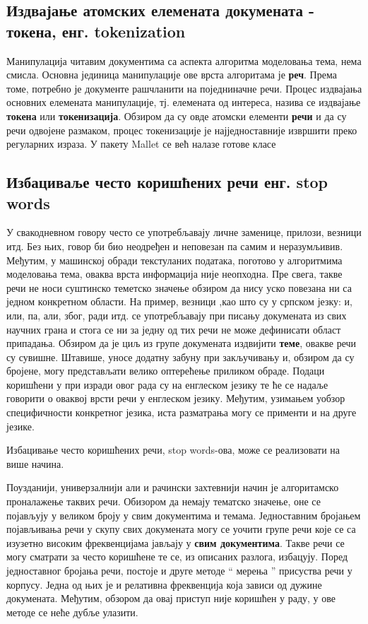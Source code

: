 \subsection{Издвајање атомских елемената докумената - токена, енг. tokenization}

Манипулација читавим документима са аспекта алгоритма моделовања тема, нема смисла. Основна јединица манипулације ове врста алгоритама је \textbf{реч}.  Према томе, потребно је документе рашчланити на поједниначне речи. Процес издвајања основних елемената манипулације, тј. елемената од интереса, назива се издвајање \textbf{токена} или \textbf{токенизација}. Обзиром да су овде атомски елементи \textbf{речи} и да су речи одвојене размаком, процес токенизације је најједноставније извршити преко регуларних израза. 
У пакету Mallet се већ налазе готове класе  

	\subsection{Избациваље често коришћених речи енг. stop words}
		
У свакодневном говору често се употребљавају личне заменице, прилози, везници итд. Без њих, говор би био неодређен и неповезан па самим и неразумљивив. Међутим, у машинској обради текстуланих података, поготово у алгоритмима моделовања тема, оваква врста информација није неопходна. Пре свега, такве  речи не носи суштинско теметско значење обзиром да нису уско повезана ни са једном конкретном области. На пример, везници ,као што су у српском језку: и, или, па, али, због, ради итд. се употребљавају при писању докумената из свих научних грана и стога се ни за једну од тих речи не може дефинисати област припадања. Обзиром да је циљ из групе докумената издвијити \textbf{теме}, овакве речи су сувишне. Штавише, уносе додатну забуну при закључивању и, обзиром да су бројене, могу представљати велико оптерећење приликом обраде.	
Подаци коришћени у при изради овог рада су на енглеском језику те ће се надаље говорити о оваквој врсти речи у енглеском језику. Међутим, узимањем уобзор специфичности конкретног језика, иста разматрања могу се применти и на друге језике.

Избацивање често коришћених речи, stop words-ова, може се реализовати на више начина. 

Поузданији, универзалнији али и рачински захтевнији начин је алгоритамско проналажење таквих речи. Обизором да немају тематско значење, оне се појављују у великом броју у свим документима и темама. Једноставним бројањем појављивања речи у скупу свих докумената могу се уочити групе речи које се са изузетно високим фреквенцијама јављају у \textbf{свим документима}. Такве речи се могу сматрати за често коришћене те се, из описаних разлога, избацују.  Поред једноставног бројања речи, постоје и друге методе "` мерења "' присуства речи у корпусу. Једна од њих је и релативна фреквенција која зависи од дужине докумената. Међутим, обзором да овај приступ није коришћен у раду, у ове методе се неће дубље улазити.

